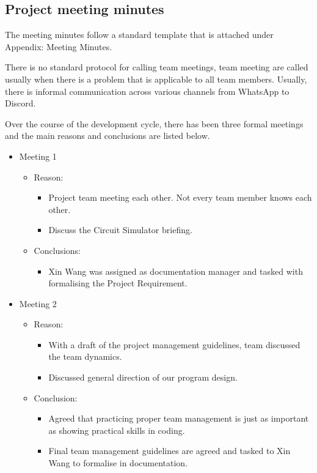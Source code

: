 \documentclass[12pt,a4paper]{article}
\begin{document}
	\vfill
	\pagebreak

	\subsection{Project meeting minutes}
	The meeting minutes follow a standard template that is attached under Appendix: Meeting Minutes. \par
	There is no standard protocol for calling team meetings, team meeting are called usually when there is a problem
	that is applicable to all team members. Usually, there is informal communication across various channels from 
	WhatsApp to Discord. \par
	Over the course of the development cycle, there has been three formal meetings and the main reasons and conclusions
	are listed below.
	\begin{itemize}
		\item Meeting 1
		\begin{itemize}
			\item Reason: 
			\begin{itemize}
				\item Project team meeting each other. Not every team member knows each other.
				\item Discuss the Circuit Simulator briefing.
			\end{itemize}
			\item Conclusions:
			\begin{itemize}
				\item Xin Wang was assigned as documentation manager and tasked with formalising the Project Requirement.
			\end{itemize}
		\end{itemize}
		\item Meeting 2
		\begin{itemize}
			\item Reason:
			\begin{itemize}
				\item With a draft of the project management guidelines, team discussed the team dynamics.
				\item Discussed general direction of our program design.
			\end{itemize}
			\item Conclusion:
			\begin{itemize}
				\item Agreed that practicing proper team management is just as important as showing practical skills 
				in coding.
				\item Final team management guidelines are agreed and tasked to Xin Wang to formalise in documentation.

\end{itemize}
\end{itemize}
\end{itemize}
\end{document}
